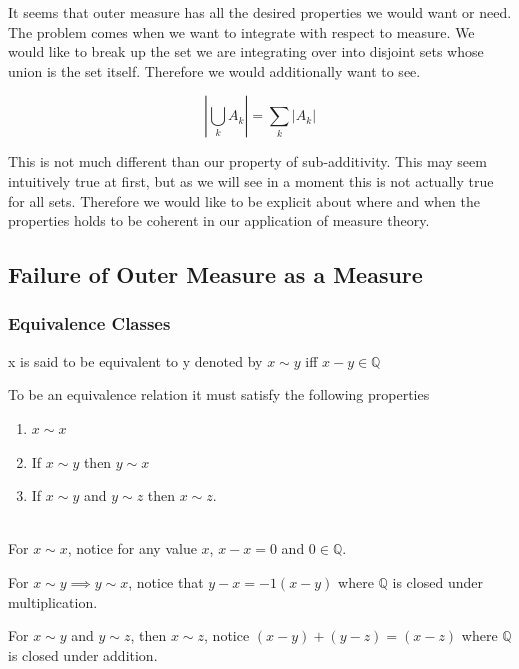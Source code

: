 \documentclass[12pt]{article}
\makeatletter
\theoremstyle{plain}
\theoremstyle{definition}
\theoremstyle{definition}
\theoremstyle{remark}
\renewenvironment{proof}[1][\proofname]{\par
\pushQED{\qed}\normalfont\topsep6\p@\@plus6\p@\relax
\trivlist\item[\hskip\labelsep\small\itshape #1\@addpunct{.}]\ignorespaces\mbox{}\\
}{\popQED\endtrivlist\@endpefalse}
\makeatother
\begin{document}
It seems that outer measure has all the desired properties we would want or need. The problem
comes when we want to integrate with respect to measure. We would like to break
up the set we are integrating over into disjoint sets whose union is the set itself. Therefore
we would additionally want to see.

\begin{equation}
    |\bigcup_k A_k| = \sum_k |A_k|
\end{equation}

This is not much different than our property of sub-additivity. This may seem
intuitively true at first, but as we will see in a moment this is not actually true for
all sets. Therefore we would like to be explicit about where and when the
properties holds to be coherent in our application of measure theory.



\subsection{Failure of Outer Measure as a Measure}

\subsubsection{Equivalence Classes}
\begin{definition}
    x is said to be equivalent to y denoted by $x \sim y$ iff $x - y \in \mathbb{Q}$
\end{definition}


To be an equivalence relation it must satisfy the following properties
\begin{enumerate}
    \item $x \sim x$
    \item If $x \sim y$ then $y \sim x$
    \item If $x \sim y$ and $y \sim z$ then $x \sim z$.
\end{enumerate}


\begin{proof}[Proof: Equivalence Relation]
    For $x \sim x$, notice for any value $x$, $x - x = 0$ and $0 \in \mathbb{Q}$.

    For $x \sim y \implies y \sim x$, notice that $y - x = -1(x - y)$ where $\mathbb{Q}$ is closed under
    multiplication.

    For $x \sim y$ and $y \sim z$, then $x \sim z$, notice $(x - y) + (y - z) = (x - z)$
    where $\mathbb{Q}$ is closed under addition.
\end{proof}
\end{document}

